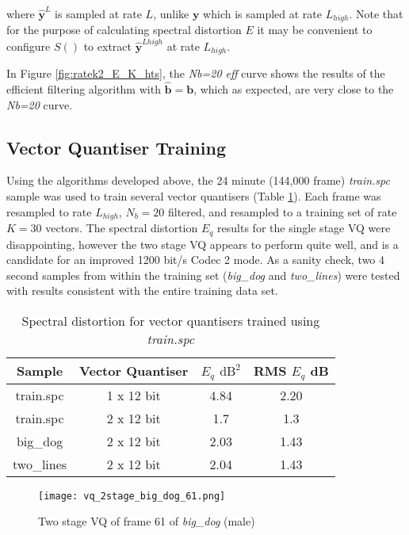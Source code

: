 \documentclass{article}
\begin{document}
where $\hat{\mathbf{y}}^L$ is sampled at rate $L$, unlike $\mathbf{y}$ which is sampled at rate $L_{high}$.  Note that for the purpose of calculating spectral distortion $E$ it may be convenient to configure $S()$ to extract $\hat{\mathbf{y}}^{Lhigh}$ at rate $L_{high}$.

In Figure \ref{fig:ratek2_E_K_hts}, the \emph{Nb=20 eff} curve shows the results of the efficient filtering algorithm with $\hat{\mathbf{b}} = \mathbf{b}$, which as expected, are very close to the \emph{Nb=20} curve.

\subsection{Vector Quantiser Training}

Using the algorithms developed above, the 24 minute (144,000 frame) \emph{train.spc} sample was used to train several vector quantisers (Table \ref{table:train_vqs}).  Each frame was resampled to rate $L_{high}$, $N_b=20$ filtered, and resampled to a training set of rate $K=30$ vectors. The spectral distortion $E_q$ results for the single stage VQ were disappointing, however the two stage VQ appears to perform quite well, and is a candidate for an improved 1200 bit/s Codec 2 mode.  As a sanity check, two 4 second samples from within the training set (\emph{big\_dog} and \emph{two\_lines}) were tested with results consistent with the entire training data set.

\begin{table}[h]
\centering
\begin{tabular}{c c c c}
 \hline
 Sample & Vector Quantiser & $E_q$ $\textrm{dB}^2$ & RMS $E_q$ dB \\
 \hline
 train.spc & 1 x 12 bit & 4.84 & 2.20 \\ 
 train.spc & 2 x 12 bit & 1.7 & 1.3 \\
 big\_dog & 2 x 12 bit & 2.03 & 1.43 \\
 two\_lines & 2 x 12 bit & 2.04 & 1.43 \\
 \hline
\end{tabular}
\caption{Spectral distortion for vector quantisers trained using \emph{train.spc}}
\label{table:train_vqs}
\end{table}

\begin{figure}[h]
\caption{Two stage VQ of frame 61 of \emph{big\_dog} (male) }
\label{fig:vq_2stage_big_dog_61}
\begin{center}
\texttt{[image: vq\_2stage\_big\_dog\_61.png]}
\end{center}
\end{figure}
\end{document}
